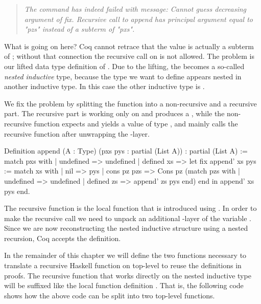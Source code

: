 \begin{quote}
\emph{The command has indeed failed with message: Cannot guess decreasing
argument of fix.
Recursive call to append has principal argument equal to "pzs" instead of a subterm of "pxs".}
\end{quote}

What is going on here?
Coq cannot retrace that the value  is actually a subterm of ; without that connection the recursive call on  is not allowed.
The problem is our lifted data type definition of
.
Due to the lifting, the  becomes a so\--called \emph{nested inductive} type, because the type we want to define
appears nested in another inductive type.
In this case the other inductive type is .

We fix the problem by splitting the function into a non\--recursive and a recursive part.
The recursive part is working only on  and produces a , while the non\--recursive
function expects and yields a value of type , and mainly calls the recursive function after unwrapping the
\--layer.

\begin{coqcode}
Definition append (A : Type) (pxs pys : partial (List A))
  : partial (List A) :=
  match pxs with
  | undefined  => undefined
  | defined xs =>
    let fix append' xs pys :=
        match xs with
        | nil         => pys
        | cons pz pzs => Cons pz (match pzs with
                                  | undefined  => undefined
                                  | defined zs => append' zs pys
                                  end)
        end
    in append' xs pys
  end.
\end{coqcode}

The recursive function is the local function  that is introduced using .
In order to make the recursive call we need to unpack an additional \--layer of the variable .
Since we are now reconstructing the nested inductive structure using a nested recursion, Coq accepts the definition.

In the remainder of this chapter we will define the two functions necessary to translate a recursive Haskell function on top\--level to reuse the definitions in proofs.
The recursive function that works directly on the nested inductive type will be suffixed like the local function definition .
That is, the following code shows how the above code can be split into two top\--level functions.

